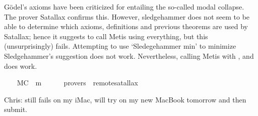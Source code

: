 %
\begin{isabellebody}%
\def\isabellecontext{GoedelGodModalCollapse}%
%
\isadelimtheory
%
\endisadelimtheory
%
\isatagtheory
%
\endisatagtheory
{\isafoldtheory}%
%
\isadelimtheory
%
\endisadelimtheory
%
\isamarkuptrue%
%
\begin{isamarkuptext}%
G\"odel's axioms have been criticized for entailing the so-called 
modal collapse. The prover Satallax \cite{Satallax} confirms this. 
However, sledgehammer does not seem to be able to determine which axioms, 
definitions and previous theorems are used by Satallax;
hence it suggests to call Metis using everything, but this (unsurprisingly) fails.
Attempting to use `Sledegehammer min' to minimize Sledgehammer's suggestion does not work.
Nevertheless, calling Metis with ,  and  does work.%
\end{isamarkuptext}%
\isamarkuptrue%
\ \ \isamarkupfalse%
\ MC{\isacharcolon}\ {\isachardoublequoteopen}{\isacharbrackleft}{\isasymforall}{\isacharparenleft}{\isasymlambda}{\isasymPhi}{\isachardot}{\isacharparenleft}{\isasymPhi}\ m{\isasymrightarrow}\ {\isacharparenleft}{\isasymbox}\ {\isasymPhi}{\isacharparenright}{\isacharparenright}{\isacharparenright}{\isacharbrackright}{\isachardoublequoteclose}\isanewline
\ \ \isamarkupfalse%
\ {\isacharbrackleft}provers\ {\isacharequal}\ remote{\isacharunderscore}satallax{\isacharbrackright}%
\isadelimproof
\ %
\endisadelimproof
%
\isatagproof
{}\isamarkupfalse%
%
\endisatagproof
{\isafoldproof}%
%
\isadelimproof
%
\endisadelimproof
%
\begin{isamarkuptext}%
Chris:  still fails on my iMac, will try on my new MacBook tomorrow and then submit.%
\end{isamarkuptext}%
\isamarkuptrue%
%
\isadelimtheory
%
\endisadelimtheory
%
\isatagtheory
%
\endisatagtheory
{\isafoldtheory}%
%
\isadelimtheory
%
\endisadelimtheory
\end{isabellebody}%
